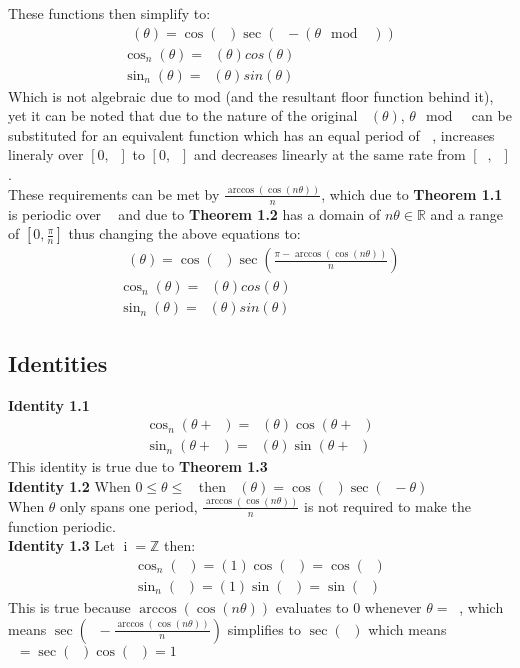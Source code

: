 \documentclass[11pt]{article}
\DeclareMathOperator{\custd}{\mathrm{d}_n}
\DeclareMathOperator{\custh}{\mathrm{h}_n}
\DeclareMathOperator{\custi}{\mathrm{i}}
\DeclareMathOperator{\period}{\frac{2\pi}{n}}
\DeclareMathOperator{\hp}{\frac{\pi}{n}}
\DeclareMathOperator{\iperiod}{\custi\frac{2\pi}{n}}
\begin{document}
These functions then simplify to:
\begin{gather*}
   		\custd(\theta)=\cos(\hp)\sec(\hp-(\theta\mod\period))\\
   		\cos_n(\theta)=\custd(\theta)cos(\theta)\\
   		\sin_n(\theta)=\custd(\theta)sin(\theta)
\end{gather*}
Which is not algebraic due to mod (and the resultant floor function behind it), yet it can be noted that due to the nature of the original \(\custh(\theta)\), \(\theta\mod\period\) can be substituted for an equivalent function which has an equal period of \(\period\), increases lineraly over \([0,\period]\) to \([0,\hp]\) and decreases linearly at the same rate from \([\hp,\period]\).\\
These requirements can be met by \(\frac{\arccos(\cos(n\theta))}{n}\), which due to \textbf{Theorem 1.1} is periodic over \(\period\) and due to \textbf{Theorem 1.2} has a domain of \(n\theta\in\mathbb{R}\) and a range of \([0,\frac{\pi}{n}]\) thus changing the above equations to:
\begin{gather*}
   		\custd(\theta)=\cos(\hp)\sec(\frac{\pi-\arccos(\cos(n\theta))}{n})\\
   		\cos_n(\theta)=\custd(\theta)cos(\theta)\\
   		\sin_n(\theta)=\custd(\theta)sin(\theta)
\end{gather*}

\pagebreak

\subsection{Identities}
\textbf{Identity 1.1} \begin{gather*}
	\cos_n(\theta+\period) = \custd(\theta)\cos(\theta+\period)\\
	\sin_n(\theta+\period) = \custd(\theta)\sin(\theta+\period)
\end{gather*} 
This identity is true due to \textbf{Theorem 1.3}\\
\textbf{Identity 1.2} When \(0\leq\theta\leq\period\) then \(\custd(\theta)=\cos(\hp)\sec(\hp-\theta)\)\\
When \(\theta\) only spans one period, \(\frac{\arccos(\cos(n\theta))}{n}\) is not required to make the function periodic.\\
\textbf{Identity 1.3} Let \(\custi=\mathbb{Z}\) then:
\begin{gather*}
	\cos_n(\iperiod) = (1)\cos(\iperiod)=\cos(\iperiod)\\
	\sin_n(\iperiod) = (1)\sin(\iperiod)=\sin(\iperiod)
\end{gather*} 
This is true because \(\arccos(\cos(n\theta))\) evaluates to 0 whenever \(\theta=\iperiod\), which means \(\sec(\hp-\frac{\arccos(\cos(n\theta))}{n})\) simplifies to \(\sec(\hp)\) which means \(\custd=\sec(\hp)\cos(\hp)=1\)
\end{document}
